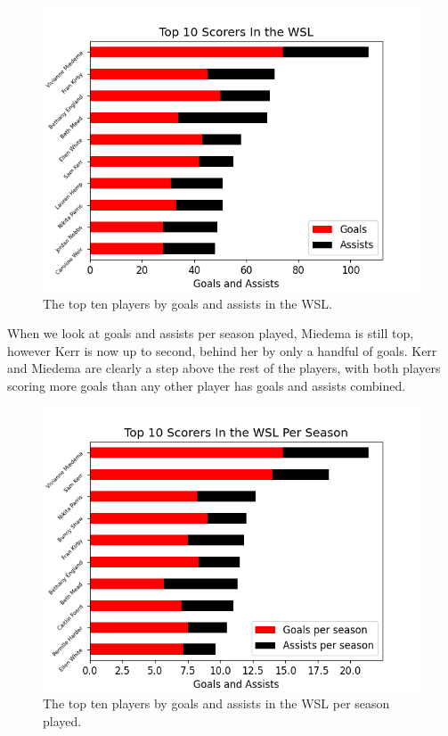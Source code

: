 \documentclass[12pt, a4paper, twocolumn]{article}
\begin{document}
\begin{figure}
  \includegraphics[width=\linewidth]{../vis/playerStats/top_scorers.png}
  \caption{The top ten players by goals and assists in the WSL.}
  \label{top_scorers}
\end{figure}

When we look at goals and assists per season played, Miedema is still top, however Kerr is now up to second, behind her by only a handful of goals. Kerr and Miedema are clearly a step above the rest of the players, with both players scoring more goals than any other player has goals and assists combined.

\begin{figure}
  \includegraphics[width=\linewidth]{../vis/playerStats/top_scorers_perseason.png}
  \caption{The top ten players by goals and assists in the WSL per season played.}
  \label{top_scorers_persseason}
\end{figure}
\end{document}
